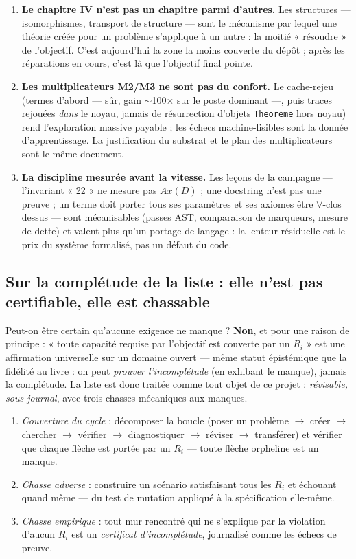 \begin{enumerate}
\item \textbf{Le chapitre IV n'est pas un chapitre parmi d'autres.} Les
  structures --- isomorphismes, transport de structure --- sont le mécanisme par
  lequel une théorie créée pour un problème s'applique à un autre : la moitié
  « résoudre » de l'objectif. C'est aujourd'hui la zone la moins couverte du
  dépôt ; après les réparations en cours, c'est là que l'objectif final pointe.
\item \textbf{Les multiplicateurs M2/M3 ne sont pas du confort.} Le cache-rejeu
  (termes d'abord --- sûr, gain $\sim$100$\times$ sur le poste dominant ---,
  puis traces rejouées \emph{dans} le noyau, jamais de résurrection d'objets
  \texttt{Theoreme} hors noyau) rend l'exploration massive payable ; les échecs
  machine-lisibles sont la donnée d'apprentissage. La justification du substrat
  et le plan des multiplicateurs sont le même document.
\item \textbf{La discipline mesurée avant la vitesse.} Les leçons de la
  campagne --- l'invariant « 22 » ne mesure pas $Ax(D)$ ; une docstring n'est
  pas une preuve ; un terme doit porter tous ses paramètres et ses axiomes être
  $\forall$-clos dessus --- sont mécanisables (passes AST, comparaison de
  marqueurs, mesure de dette) et valent plus qu'un portage de langage : la
  lenteur résiduelle est le prix du système formalisé, pas un défaut du code.
\end{enumerate}

\subsection{Sur la complétude de la liste : elle n'est pas certifiable, elle est chassable}

Peut-on être certain qu'aucune exigence ne manque ? \textbf{Non}, et pour une
raison de principe : « toute capacité requise par l'objectif est couverte par un
$R_i$ » est une affirmation universelle sur un domaine ouvert --- même statut
épistémique que la fidélité au livre : on peut \emph{prouver l'incomplétude}
(en exhibant le manque), jamais la complétude. La liste est donc traitée comme
tout objet de ce projet : \emph{révisable, sous journal}, avec trois chasses
mécaniques aux manques.

\begin{enumerate}
\item \emph{Couverture du cycle} : décomposer la boucle (poser un problème
  $\to$ créer $\to$ chercher $\to$ vérifier $\to$ diagnostiquer $\to$ réviser
  $\to$ transférer) et vérifier que chaque flèche est portée par un $R_i$ ---
  toute flèche orpheline est un manque.
\item \emph{Chasse adverse} : construire un scénario satisfaisant tous les
  $R_i$ et échouant quand même --- du test de mutation appliqué à la
  spécification elle-même.
\item \emph{Chasse empirique} : tout mur rencontré qui ne s'explique par la
  violation d'aucun $R_i$ est un \emph{certificat d'incomplétude}, journalisé
  comme les échecs de preuve.
\end{enumerate}


